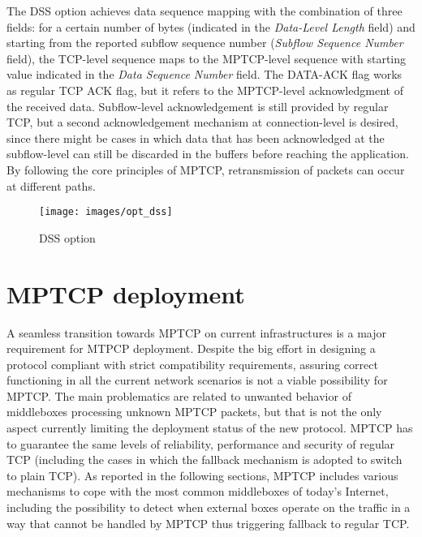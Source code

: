 The DSS option achieves data sequence mapping with the combination of three fields: for a certain number of bytes (indicated in the \textit{Data-Level Length} field) and starting from the reported subflow sequence number (\textit{Subflow Sequence Number} field), the TCP-level sequence maps to the MPTCP-level sequence with starting value indicated in the \textit{Data Sequence Number} field.
The DATA-ACK flag works as regular TCP ACK flag, but it refers to the MPTCP-level acknowledgment of the received data. Subflow-level acknowledgement is still provided by regular TCP, but a second acknowledgement mechanism at connection-level is desired, since there might be cases in which data that has been acknowledged at the subflow-level can still be discarded in the buffers before reaching the application. By following the core principles of MPTCP, retransmission of packets can occur at different paths.

\begin{figure}[!htb]
\centering
\texttt{[image: images/opt\_dss]}
\caption{DSS option}
\label{fig:opt_dss}
\end{figure}

\section{MPTCP deployment}
A seamless transition towards MPTCP on current infrastructures is a major requirement for MTPCP deployment.
Despite the big effort in designing a protocol compliant with strict compatibility requirements, assuring correct functioning in all the current network scenarios is not a viable possibility for MPTCP. The main problematics are related to unwanted behavior of middleboxes processing unknown MPTCP packets, but that is not the only aspect currently limiting the deployment status of the new protocol. MPTCP has to guarantee the same levels of reliability, performance and security of regular TCP (including the cases in which the fallback mechanism is adopted to switch to plain TCP).
As reported in the following sections, MPTCP includes various mechanisms to cope with the most common middleboxes of today's Internet, including the possibility to detect when external boxes operate on the traffic in a way that cannot be handled by MPTCP thus triggering fallback to regular TCP.

